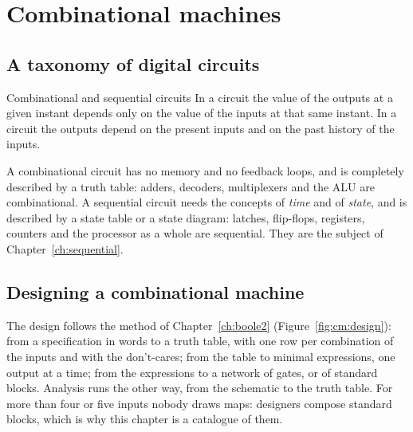 \section{Combinational machines}

\subsection{A taxonomy of digital circuits}

\begin{definition}{Combinational and sequential circuits}
In a  circuit the value of the outputs at a given instant
depends only on the value of the inputs at that same instant. In a
 circuit the outputs depend on the present inputs and on the
past history of the inputs.
\end{definition}

A combinational circuit has no memory and no feedback loops, and is completely
described by a truth table: adders, decoders, multiplexers and the ALU are
combinational. A sequential circuit needs the concepts of \emph{time} and of
\emph{state}, and is described by a state table or a state diagram: latches,
flip-flops, registers, counters and the processor as a whole are sequential.
They are the subject of Chapter~\ref{ch:sequential}.

\subsection{Designing a combinational machine}

The design follows the method of Chapter~\ref{ch:boole2}
(Figure~\ref{fig:cm:design}): from a specification in words to a truth table,
with one row per combination of the inputs and with the don't-cares; from the
table to minimal expressions, one output at a time; from the expressions to a
network of gates, or of standard blocks. Analysis runs the other way, from
the schematic to the truth table. For more than four or five inputs nobody
draws maps: designers compose standard blocks, which is why this chapter is a
catalogue of them.

